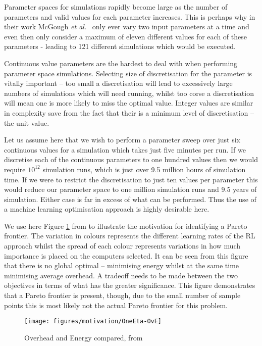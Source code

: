 \documentclass[10pt, conference, compsocconf]{IEEEtran}
\begin{document}
Parameter spaces for simulations rapidly become large as the number of parameters and valid values for each parameter increases. This is perhaps why in their work McGough \textit{et al.}~\cite{suscom} only ever vary two input parameters at a time and even then only consider a maximum of eleven different values for each of these parameters - leading to 121 different simulations which would be executed. 

Continuous value parameters are the hardest to deal with when performing parameter space simulations. Selecting size of discretisation for the parameter is vitally important -- too small a discretisation will lead to excessively large numbers of simulations which will need running, whilst too corse a discretisation will mean one is more likely to miss the optimal value. Integer values are similar in complexity save from the fact that their is a minimum level of discretisation -- the unit value. 

Let us assume here that we wish to perform a parameter sweep over just six continuous values for a simulation which takes just five minutes per run. If we discretise each of the continuous parameters to one hundred values then we would require $10^12$ simulation runs, which is just over 9.5 million hours of simulation time. If we were to restrict the discretisation to just ten values per parameter this would reduce our parameter space to one million simulation runs and 9.5 years of simulation. Either case is far in excess of what can be performed. Thus the use of a machine learning optimisation approach is highly desirable here.

We use here Figure \ref{ohven} from \cite{suscom} to illustrate the motivation for identifying a Pareto frontier. The variation in colours represents the different learning rates of the RL approach whilst the spread of each colour represents variations in how much importance is placed on the computers selected. It can be seen from this figure that there is no global optimal -- minimising energy whilst at the same time minimising average overhead. A tradeoff needs to be made between the two objectives in terms of what has the greater significance. This figure demonstrates that a Pareto frontier is present, though, due to the small number of sample points this is most likely not the actual Pareto frontier for this problem.

\begin{figure}[t]
\centering
\texttt{[image: figures/motivation/OneEta-OvE]}
\caption{Overhead and Energy compared, from \cite{suscom}}
\label{ohven}
\end{figure}
\end{document}
